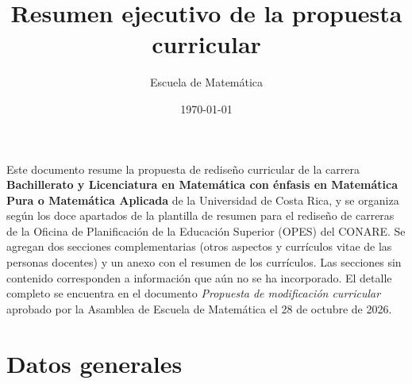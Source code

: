\documentclass[11pt,a4paper]{article}
\title{Resumen ejecutivo de la propuesta curricular}
\author{Escuela de Matemática}
\date{\today}
\begin{document}


Este documento resume la propuesta de rediseño curricular de la carrera \textbf{Bachillerato y Licenciatura en Matemática con énfasis en Matemática Pura o Matemática Aplicada} de la Universidad de Costa Rica, y se organiza según los doce apartados de la plantilla de resumen para el rediseño de carreras de la Oficina de Planificación de la Educación Superior (OPES) del CONARE. Se agregan dos secciones complementarias (otros aspectos y currículos vitae de las personas docentes) y un anexo con el resumen de los currículos. Las secciones sin contenido corresponden a información que aún no se ha incorporado. El detalle completo se encuentra en el documento \emph{Propuesta de modificación curricular} aprobado por la Asamblea de Escuela de Matemática el 28 de octubre de 2026.

\section{Datos generales}
\end{document}
